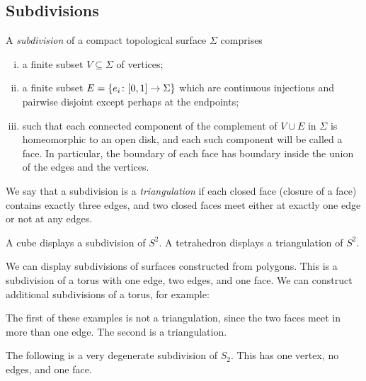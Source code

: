\subsection{Subdivisions}
\begin{definition}
	A \textit{subdivision} of a compact topological surface \( \Sigma \) comprises
	\begin{enumerate}[(i)]
		\item a finite subset \( V \subseteq \Sigma \) of vertices;
		\item a finite subset \( E = \qty{e_i \colon [0,1] \to \Sigma} \) which are continuous injections and pairwise disjoint except perhaps at the endpoints;
		\item such that each connected component of the complement of \( V \cup E \) in \( \Sigma \) is homeomorphic to an open disk, and each such component will be called a face.
			In particular, the boundary of each face has boundary inside the union of the edges and the vertices.
	\end{enumerate}
	We say that a subdivision is a \textit{triangulation} if each closed face (closure of a face) contains exactly three edges, and two closed faces meet either at exactly one edge or not at any edges.
\end{definition}
\begin{example}
	A cube displays a subdivision of \( S^2 \).
	A tetrahedron displays a triangulation of \( S^2 \).
\end{example}
\begin{example}
	We can display subdivisions of surfaces constructed from polygons.
	This is a subdivision of a torus with one edge, two edges, and one face.
	We can construct additional subdivisions of a torus, for example:
	\begin{center}
		 \quad {}
	\end{center}
	The first of these examples is not a triangulation, since the two faces meet in more than one edge.
	The second is a triangulation.
\end{example}
\begin{remark}
	The following is a very degenerate subdivision of \( S_2 \).
	This has one vertex, no edges, and one face.
\end{remark}

